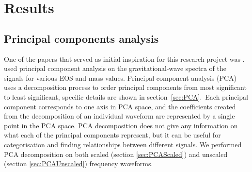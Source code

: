 \section{Results}


\subsection{Principal components analysis}
\label{sec:PCAresults}
One of the papers that served as initial inspiration for this research project was \cite*{Clark2015}. \cite{Clark2015} used principal component analysis on the gravitational-wave spectra of the  signals for various EOS and mass values. Principal component analysis (PCA) uses a decomposition process to order principal components from most significant to least significant, specific details are shown in section~\ref{sec:PCA}.\color{black}\ Each principal component corresponds to one axis in PCA space, and the coefficients created from the decomposition of an individual waveform are represented by a single point in the PCA space. PCA decomposition does not give any information on what each of the principal components represent, but it can be useful for categorisation and finding relationships between different signals. We performed PCA decomposition on both  scaled (section \ref{sec:PCAScaled}) and  unscaled (section \ref{sec:PCAUnscaled}) frequency waveforms. 


